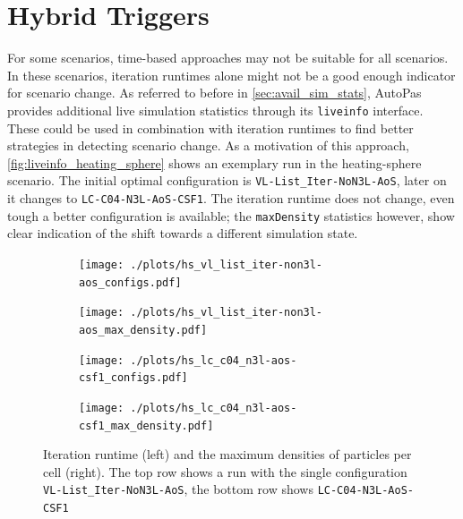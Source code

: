 

\section{Hybrid Triggers}
\label{sec:liveinfo_benchmarks}

For some scenarios, time-based approaches may not be suitable for all scenarios. In these scenarios, iteration runtimes alone might not be a good enough indicator for scenario change. As referred to before in \autoref{sec:avail_sim_stats}, AutoPas provides additional live simulation statistics through its \texttt{liveinfo} interface. These could be used in combination with iteration runtimes to find better strategies in detecting scenario change.
As a motivation of this approach, \autoref{fig:liveinfo_heating_sphere} shows an exemplary run in the heating-sphere scenario.
The initial optimal configuration is \texttt{VL-List\_Iter-NoN3L-AoS}, later on it changes to \texttt{LC-C04-N3L-AoS-CSF1}. \cite{Newcome2025}
The iteration runtime does not change, even tough a better configuration is available; the \texttt{maxDensity} statistics however, show clear indication of the shift towards a different simulation state.


\begin{figure}[htpb]
	\centering
	\begin{subfigure}{0.5\textwidth}
		\texttt{[image: ./plots/hs\_vl\_list\_iter-non3l-aos\_configs.pdf]}
	\end{subfigure}%
	\begin{subfigure}{0.5\textwidth}
		\texttt{[image: ./plots/hs\_vl\_list\_iter-non3l-aos\_max\_density.pdf]}
	\end{subfigure}
	\begin{subfigure}{0.5\textwidth}
		\texttt{[image: ./plots/hs\_lc\_c04\_n3l-aos-csf1\_configs.pdf]}
	\end{subfigure}%
	\begin{subfigure}{0.5\textwidth}
		\texttt{[image: ./plots/hs\_lc\_c04\_n3l-aos-csf1\_max\_density.pdf]}
	\end{subfigure}
	\caption{Iteration runtime (left) and the maximum densities of particles per cell (right). The top row shows a run with the single configuration \texttt{VL-List\_Iter-NoN3L-AoS}, the bottom row shows \texttt{LC-C04-N3L-AoS-CSF1}}
	\label{fig:liveinfo_heating_sphere}
\end{figure}






